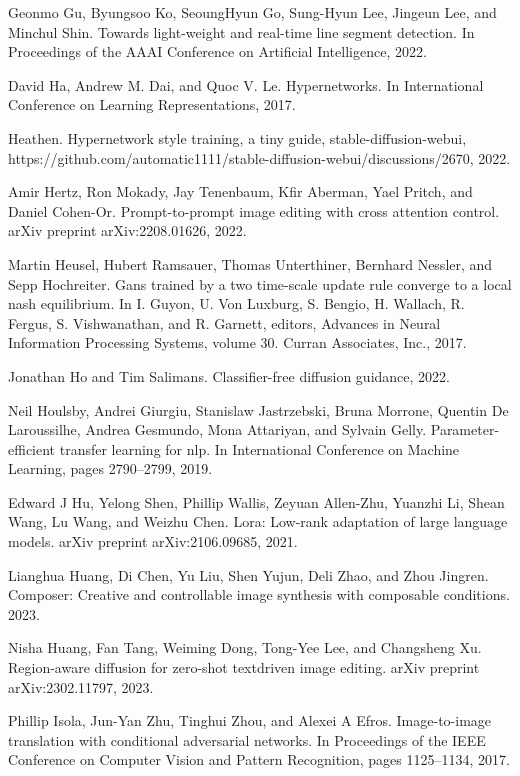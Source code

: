 \documentclass[a4paper,AutoFakeBold,oneside,12pt]{book}
\begin{document}
\begin{nopagenumber}
\noindent
[24] Geonmo Gu, Byungsoo Ko, SeoungHyun Go, Sung-Hyun Lee, Jingeun Lee, and Minchul Shin. Towards light-weight and real-time line segment detection. In Proceedings of the AAAI Conference on Artificial Intelligence, 2022.

\noindent
[25] David Ha, Andrew M. Dai, and Quoc V. Le. Hypernetworks. In International Conference on Learning Representations, 2017.

\noindent
[26] Heathen. Hypernetwork style training, a tiny guide, stable-diffusion-webui, https://github.com/automatic1111/stable-diffusion-webui/discussions/2670, 2022.

\noindent
[27] Amir Hertz, Ron Mokady, Jay Tenenbaum, Kfir Aberman, Yael Pritch, and Daniel Cohen-Or. Prompt-to-prompt image editing with cross attention control. arXiv preprint arXiv:2208.01626, 2022.

\noindent
[28] Martin Heusel, Hubert Ramsauer, Thomas Unterthiner, Bernhard Nessler, and Sepp Hochreiter. Gans trained by a two time-scale update rule converge to a local nash equilibrium. In I. Guyon, U. Von Luxburg, S. Bengio, H. Wallach, R. Fergus, S. Vishwanathan, and R. Garnett, editors, Advances in Neural Information Processing Systems, volume 30. Curran Associates, Inc., 2017.

\noindent
[29] Jonathan Ho and Tim Salimans. Classifier-free diffusion guidance, 2022.

\noindent
[30] Neil Houlsby, Andrei Giurgiu, Stanislaw Jastrzebski, Bruna Morrone, Quentin De Laroussilhe, Andrea Gesmundo, Mona Attariyan, and Sylvain Gelly. Parameter-efficient transfer learning for nlp. In International Conference on Machine Learning, pages 2790–2799, 2019.

\noindent
[31] Edward J Hu, Yelong Shen, Phillip Wallis, Zeyuan Allen-Zhu, Yuanzhi Li, Shean Wang, Lu Wang, and Weizhu Chen. Lora: Low-rank adaptation of large language models. arXiv preprint arXiv:2106.09685, 2021.

\noindent
[32] Lianghua Huang, Di Chen, Yu Liu, Shen Yujun, Deli Zhao, and Zhou Jingren. Composer: Creative and controllable image synthesis with composable conditions. 2023.

\noindent
[33] Nisha Huang, Fan Tang, Weiming Dong, Tong-Yee Lee, and Changsheng Xu. Region-aware diffusion for zero-shot textdriven image editing. arXiv preprint arXiv:2302.11797, 2023.

\noindent
[34] Phillip Isola, Jun-Yan Zhu, Tinghui Zhou, and Alexei A Efros. Image-to-image translation with conditional adversarial networks. In Proceedings of the IEEE Conference on Computer Vision and Pattern Recognition, pages 1125–1134, 2017.


\end{nopagenumber}
\end{document}
